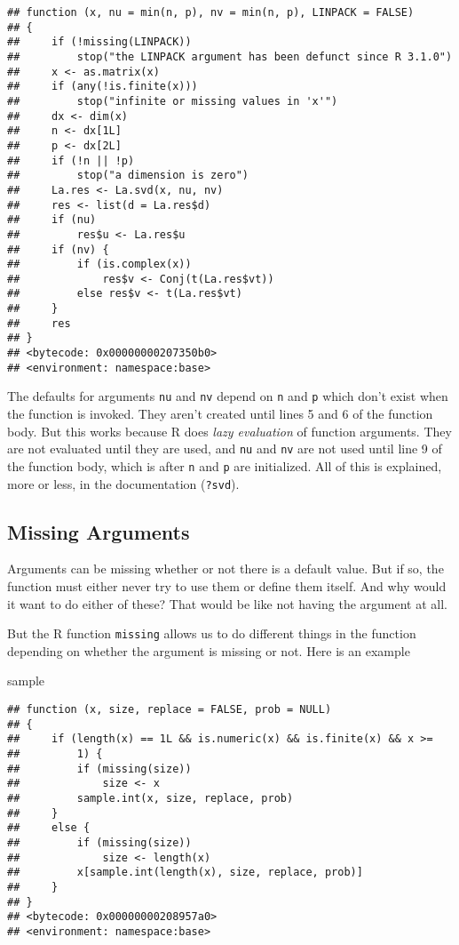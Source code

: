 \documentclass[
]{article}
\newenvironment{Shaded}{\begin{snugshade}}{\end{snugshade}}
\newcommand{\NormalTok}[1]{#1}
\begin{document}
\begin{verbatim}
## function (x, nu = min(n, p), nv = min(n, p), LINPACK = FALSE) 
## {
##     if (!missing(LINPACK)) 
##         stop("the LINPACK argument has been defunct since R 3.1.0")
##     x <- as.matrix(x)
##     if (any(!is.finite(x))) 
##         stop("infinite or missing values in 'x'")
##     dx <- dim(x)
##     n <- dx[1L]
##     p <- dx[2L]
##     if (!n || !p) 
##         stop("a dimension is zero")
##     La.res <- La.svd(x, nu, nv)
##     res <- list(d = La.res$d)
##     if (nu) 
##         res$u <- La.res$u
##     if (nv) {
##         if (is.complex(x)) 
##             res$v <- Conj(t(La.res$vt))
##         else res$v <- t(La.res$vt)
##     }
##     res
## }
## <bytecode: 0x00000000207350b0>
## <environment: namespace:base>
\end{verbatim}

The defaults for arguments \texttt{nu} and \texttt{nv} depend on
\texttt{n} and \texttt{p} which don't exist when the function is
invoked. They aren't created until lines 5 and 6 of the function body.
But this works because R does \emph{lazy evaluation} of function
arguments. They are not evaluated until they are used, and \texttt{nu}
and \texttt{nv} are not used until line 9 of the function body, which is
after \texttt{n} and \texttt{p} are initialized. All of this is
explained, more or less, in the documentation (\texttt{?svd}).

\hypertarget{missing-arguments}{%
\subsection{Missing Arguments}\label{missing-arguments}}

Arguments can be missing whether or not there is a default value. But if
so, the function must either never try to use them or define them
itself. And why would it want to do either of these? That would be like
not having the argument at all.

But the R function \texttt{missing} allows us to do different things in
the function depending on whether the argument is missing or not. Here
is an example

\begin{Shaded}
\begin{Highlighting}[]
\NormalTok{sample}
\end{Highlighting}
\end{Shaded}

\begin{verbatim}
## function (x, size, replace = FALSE, prob = NULL) 
## {
##     if (length(x) == 1L && is.numeric(x) && is.finite(x) && x >= 
##         1) {
##         if (missing(size)) 
##             size <- x
##         sample.int(x, size, replace, prob)
##     }
##     else {
##         if (missing(size)) 
##             size <- length(x)
##         x[sample.int(length(x), size, replace, prob)]
##     }
## }
## <bytecode: 0x00000000208957a0>
## <environment: namespace:base>
\end{verbatim}
\end{document}
